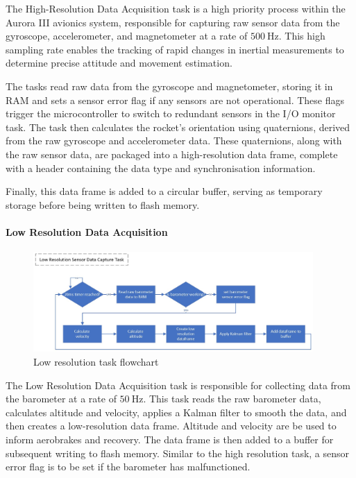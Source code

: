 The High-Resolution Data Acquisition task is a high priority process within the Aurora III avionics system, responsible for capturing raw sensor data from the gyroscope, accelerometer, and magnetometer at a rate of $\SI{500}{\hertz}$. This high sampling rate enables the tracking of rapid changes in inertial measurements to determine precise attitude and movement estimation. 

The tasks read raw data from the gyroscope and magnetometer, storing it in RAM and sets a sensor error flag if any sensors are not operational. These flags trigger the microcontroller to switch to redundant sensors in the I/O monitor task. The task then calculates the rocket's orientation using quaternions, derived from the raw gyroscope and accelerometer data. These quaternions, along with the raw sensor data, are packaged into a high-resolution data frame, complete with a header containing the data type and synchronisation information. 

Finally, this data frame is added to a circular buffer, serving as temporary storage before being written to flash memory.  

 
\paragraph{Low Resolution Data Acquisition}
\begin{figure}[ht!]
  \begin{center}
    \includegraphics[width=0.95\textwidth]{./img/Section_4_2_2_2.jpeg}
  \end{center}
  \caption{Low resolution task flowchart}\label{fig:flowchart-low_res}
\end{figure}

The Low Resolution Data Acquisition task is responsible for collecting data from the barometer at a rate of $\SI{50}{\hertz}$. This task reads the raw barometer data, calculates altitude and velocity, applies a Kalman filter to smooth the data, and then creates a low-resolution data frame. Altitude and velocity are be used to inform aerobrakes and recovery. The data frame is then added to a buffer for subsequent writing to flash memory. Similar to the high resolution task, a sensor error flag is to be set if the barometer has malfunctioned.  

